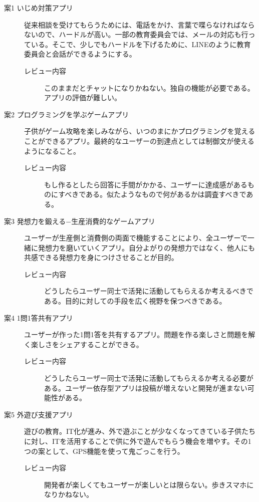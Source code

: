 \documentclass[openany,11pt,papersize]{jsbook}
\begin{document}
\begin{description}
 \item[案1 いじめ対策アプリ]
従来相談を受けてもらうためには、電話をかけ、言葉で喋らなければならないので、ハードルが高い。一部の教育委員会では、メールの対応も行っている。そこで、少しでもハードルを下げるために、LINEのように教育委員会と会話ができるようにする。
	\begin{description}
 	\item[レビュー内容]
	このままだとチャットになりかねない。独自の機能が必要である。アプリの評価が難しい。
	 \end{description}
 
  \item[案2 プログラミングを学ぶゲームアプリ]
子供がゲーム攻略を楽しみながら、いつのまにかプログラミングを覚えることができるアプリ。最終的なユーザーの到達点としては制御文が使えるようになること。
	\begin{description}
 	\item[レビュー内容]
	もし作るとしたら回答に手間がかかる、ユーザーに達成感があるものにすべきである。似たようなもので何があるかは調査すべきである。
	 \end{description}

  \item[案3 発想力を鍛える−生産消費的なゲームアプリ]
  ユーザーが生産側と消費側の両面で機能することにより、全ユーザーで一緒に発想力を磨いていくアプリ。自分よがりの発想力ではなく、他人にも共感できる発想力を身につけさせることが目的。
	\begin{description}
 	\item[レビュー内容]
	どうしたらユーザー同士で活発に活動してもらえるか考えるべきである。目的に対しての手段を広く視野を保つべきである。
	 \end{description}
	 
 \item[案4 1問1答共有アプリ]
  ユーザーが作った1問1答を共有するアプリ。問題を作る楽しさと問題を解く楽しさをシェアすることができる。
	\begin{description}
 	\item[レビュー内容]
	どうしたらユーザー同士で活発に活動してもらえるか考える必要がある。ユーザー依存型アプリは投稿が増えないと開発が進まない可能性がある。
	 \end{description}
	 
 \item[案5 外遊び支援アプリ]
遊びの教育。IT化が進み、外で遊ぶことが少なくなってきている子供たちに対し、ITを活用することで供に外で遊んでもらう機会を増やす。その1つの案として、GPS機能を使って鬼ごっこを行う。
	\begin{description}
 	\item[レビュー内容]
	開発者が楽しくてもユーザーが楽しいとは限らない。歩きスマホになりかねない。
	 \end{description}

 \end{description}
 
\end{document}
